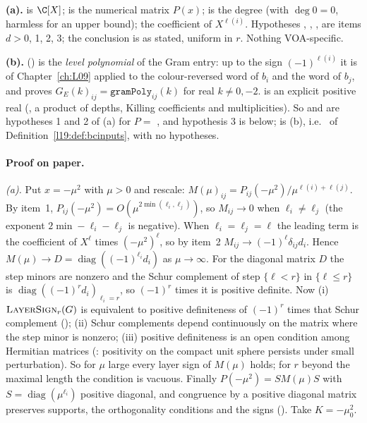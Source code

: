 \begin{dictionary}
\textbf{(a).}  is $\C[X]$;  is the numerical matrix $P(x)$;
 is the degree (with $\deg 0 = 0$, harmless for an upper bound);  the coefficient of
$X^{\ell(i)}$. Hypotheses , , ,  are items $d>0$, 1, 2, 3; the conclusion
is as stated, uniform in $r$. Nothing VOA-specific.

\textbf{(b).}  () is the \emph{level polynomial}
of the Gram entry: up to the sign $(-1)^{\ell(i)}$ it is  of Chapter~\ref{ch:L09} applied
to the colour-reversed word of $b_i$ and the word of $b_j$, and  proves
$G_E(k)_{ij} = \mathtt{gramPoly}_{ij}(k)$ for real $k\ne0,-2$.  is an explicit positive real
(, a product of depths, Killing coefficients and multiplicities). So
 and  are hypotheses 1 and 2 of (a) for $P = $
, and hypothesis 3 is  below;  is (b),
i.e.\  of Definition~\ref{l19:def:bcinputs}, with no hypotheses.
\end{dictionary}

\paragraph{Proof on paper.} \emph{(a).} Put $x = -\mu^2$ with $\mu>0$ and rescale:
$M(\mu)_{ij} = P_{ij}(-\mu^2)/\mu^{\ell(i)+\ell(j)}$. By item~1, $P_{ij}(-\mu^2) = O(\mu^{2\min(\ell_i,\ell_j)})$, so
$M_{ij}\to0$ when $\ell_i\ne\ell_j$ (the exponent $2\min-\ell_i-\ell_j$ is negative). When $\ell_i = \ell_j = \ell$ the
leading term is the coefficient of $X^\ell$ times $(-\mu^2)^\ell$, so by item~2 $M_{ij}\to(-1)^\ell\delta_{ij}d_i$.
Hence $M(\mu)\to D = \operatorname{diag}((-1)^{\ell_i}d_i)$ as $\mu\to\infty$. For the diagonal matrix $D$ the step
minors are nonzero and the Schur complement of step $\{\ell<r\}$ in $\{\ell\le r\}$ is $\operatorname{diag}((-1)^rd_i)_{\ell_i = r}$, so
$(-1)^r$ times it is positive definite. Now (i) $\textsc{LayerSign}_r(G)$ is equivalent to positive definiteness of
$(-1)^r$ times that Schur complement (); (ii) Schur complements depend continuously on
the matrix where the step minor is nonzero; (iii) positive definiteness is an open condition among Hermitian
matrices (: positivity on the compact unit sphere persists under small perturbation). So for
$\mu$ large every layer sign of $M(\mu)$ holds; for $r$ beyond the maximal length the condition is vacuous. Finally
$P(-\mu^2) = SM(\mu)S$ with $S = \operatorname{diag}(\mu^{\ell_i})$ positive diagonal, and congruence by a positive
diagonal matrix preserves supports, the orthogonality conditions and the signs (). Take
$K = -\mu_0^2$.

